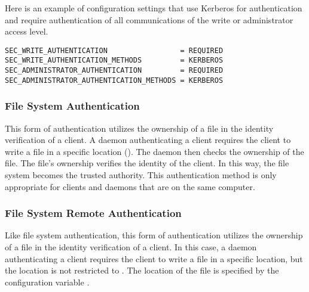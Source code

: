 Here is
an example of configuration settings that use Kerberos for
authentication and require authentication of all communications
of the write or administrator access level.
\footnotesize
\begin{verbatim}
SEC_WRITE_AUTHENTICATION                 = REQUIRED
SEC_WRITE_AUTHENTICATION_METHODS         = KERBEROS
SEC_ADMINISTRATOR_AUTHENTICATION         = REQUIRED
SEC_ADMINISTRATOR_AUTHENTICATION_METHODS = KERBEROS
\end{verbatim}
\normalsize

\subsubsection{\label{sec:FS-Authentication}File System Authentication}

This form of authentication utilizes the ownership of a file
in the identity verification of a client.
A daemon authenticating a client requires the client to write
a file in a specific location ().
The daemon then checks the ownership of the file.
The file's ownership verifies the identity of the client.
In this way, the file system becomes the trusted authority.
This authentication method is only appropriate for clients and daemons
that are on the same computer. 

\subsubsection{\label{sec:FSR-Authentication}File System Remote Authentication}
Like file system authentication,
this form of authentication utilizes the ownership of a file
in the identity verification of a client.
In this case,
a daemon authenticating a client requires the client to write
a file in a specific location,
but the location is not restricted to .
The location of the file is specified by the configuration
variable .



